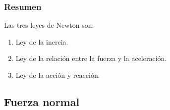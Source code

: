 \documentclass[14pt]{beamer}
\begin{document}
\begin{frame}
\begin{figure}
\end{figure}
\end{frame}
\begin{frame}
\frametitle{Resumen}
Las tres leyes de Newton son:
\pause
{}
\begin{enumerate}[<+->]
\item Ley de la inercia.
\item Ley de la relación entre la fuerza y la aceleración.
\item Ley de la acción y reacción.
\end{enumerate}
\end{frame}

\subsection{Fuerza normal}
\end{document}
